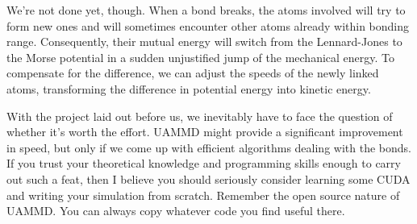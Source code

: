 We're not done yet, though. When a bond breaks, the atoms involved will try to 
form new ones and will sometimes encounter other atoms already within bonding 
range. Consequently, their mutual energy will switch from the Lennard-Jones to 
the Morse potential in a sudden unjustified jump of the mechanical energy. To 
compensate for the difference, we can adjust the speeds of the newly linked 
atoms, transforming the difference in potential energy into kinetic energy.

With the project laid out before us, we inevitably have to face the question of 
whether it's worth the effort. UAMMD might provide a significant improvement in 
speed, but only if we come up with efficient algorithms dealing with the bonds. 
If you trust your theoretical knowledge and programming skills enough to carry 
out such a feat, then I believe you should seriously consider learning some CUDA 
and writing your simulation from scratch. Remember the open source nature of 
UAMMD. You can always copy whatever code you find useful there.

